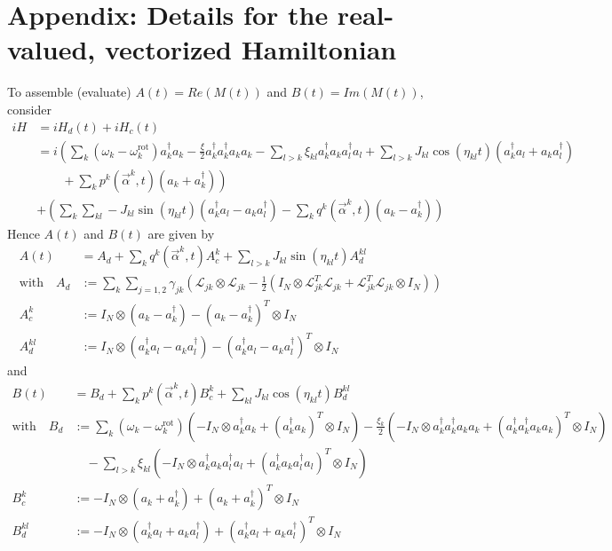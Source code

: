 \documentclass[11pt]{article}
\newcommand{\Ell}{\mathcal{L}}
\begin{document}




\appendix
 \section{Appendix: Details for the real-valued, vectorized Hamiltonian}
   To assemble (evaluate) 
   $A(t) = Re(M(t))$ and $B(t) = Im(M(t))$, consider
   \begin{align}
    iH &= iH_d(t) + iH_c(t) \\
      &= i\left( \sum_k (\omega_k - \omega_k^{\text{rot}}) a_k^\dagger a_k - \frac{\xi}{2}a_k^\dagger a_k^\dagger a_k a_k  - \sum_{l>k}  \xi_{kl} a_k^\dagger a_k a_l^\dagger a_l +  \sum_{l>k} J_{kl} \cos(\eta_{kl}t)\left(a_k^\dagger a_l + a_ka_l^\dagger \right)
       \right.\\
      & \left. \quad \quad + \sum_k p^k(\vec{\alpha}^k,t) \left(a_k + a_k^\dagger\right) \right)\\
      &+ \left( \sum_k \sum_{kl} - J_{kl} \sin(\eta_{kl}t) \left(a_k^\dagger a_l - a_ka_l^\dagger\right)  - \sum_k q^k(\vec{\alpha}^k, t)\left(a_k - a_k^\dagger\right)\right)
   \end{align}
   Hence $A(t)$ and $B(t)$ are given by 
   \begin{align}
    A(t) &= A_d + \sum_k  q^k(\vec{\alpha}^k,t) A_c^k + \sum_{l>k} J_{kl} \sin(\eta_{kl}t)  A_d^{kl} \\
   \text{with} \quad  A_d &:= \sum_k \sum_{j=1,2} \gamma_{jk} \left( \Ell_{jk}\otimes\Ell_{jk} - \frac 1 2 \left(I_N \otimes \Ell_{jk}^T\Ell_{jk} + \Ell_{jk}^T\Ell_{jk}\otimes I_N\right) \right)\\
    A_c^k &:=  I_N \otimes \left(a_k - a_k^\dagger\right) - \left(a_k - a_k^\dagger\right)^T\otimes I_N \\
    A_d^{kl} &:=  I_N\otimes \left(a_k^\dagger a_l - a_k a_l^\dagger\right) - \left(a_k^\dagger a_l - a_k a_l^\dagger\right)^T\otimes I_N 
   \end{align}
   and
   \begin{align}
     B(t) &=  B_d + \sum_k p^k(\vec{\alpha}^k,t) B_c^k + \sum_{kl} J_{kl} \cos(\eta_{kl}t)B_d^{kl}\\
     \text{with} \quad B_d &:= \sum_k (\omega_k - \omega_k^{\text{rot}}) \left(-I_N \otimes a_k^\dagger a_k + (a_k^\dagger a_k)^T \otimes I_N \right) - \frac{\xi_k}{2}\left(- I_N \otimes a_k^\dagger a_k^\dagger a_k a_k + (a_k^\dagger a_k^\dagger a_k a_k )^T\otimes I_N\right)  \\
       &\quad - \sum_{l>k}  \xi_{kl} \left(-I_N \otimes a_k^\dagger a_k a_l^\dagger a_l + (a_k^\dagger a_k a_l^\dagger a_l)^T \otimes I_N \right)\\
       B_c^k &:=  - I_N \otimes \left(a_k + a_k^\dagger\right) + \left(a_k + a_k^\dagger\right)^T\otimes I_N \\
       B_d^{kl} &:=  - I_N\otimes \left(a_k^\dagger a_l + a_k a_l^\dagger\right) + \left(a_k^\dagger a_l + a_k a_l^\dagger\right)^T\otimes I_N \\
   \end{align}
\end{document}

